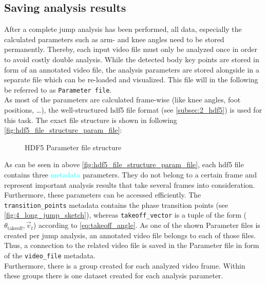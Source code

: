 \subsection{Saving analysis results}\label{subsec:4_param_files}
After a complete jump analysis has been performed, all data, especially
the calculated parameters such as arm- and knee angles need to be stored
permanently.
Thereby, each input video file must only be analyzed once in order to avoid
costly double analysis.
While the detected body key points are stored in form of an annotated video
file, the analysis parameters are stored alongside in a separate file which
can be re-loaded and visualized.
This file will in the following be referred to as \texttt{Parameter file}.\\
As most of the parameters are calculated frame-wise (like knee angles, foot
positions, \dots), the well-structured hdf5 file format (see
\autoref{subsec:2_hdf5}) is used for this task.
The exact file structure is shown in following 
\autoref{fig:hdf5_file_structure_param_file}:
\begin{figure}[h!]
    \centering
    \caption[HDF5 Parameter file structure]{HDF5 Parameter file structure}
    \label{fig:hdf5_file_structure_param_file}
\end{figure}
\FloatBarrier
\noindent As can be seen in above \autoref{fig:hdf5_file_structure_param_file},
each hdf5 file contains three \textcolor{cyan}{metadata} parameters.
They do not belong to a certain frame and represent important analysis results
that take several frames into consideration.
Furthermore, these parameters can be accessed efficiently.
The \texttt{transition\_points} metadata contains the phase transition points
(see \autoref{fig:4_long_jump_sketch}), whereas \texttt{takeoff\_vector} is a
tuple of the form ($\theta_{\text{takeoff}}, \vec{{}v}_t$) according to
\autoref{eq:takeoff_angle}.
As one of the shown Parameter files is created per jump analysis, an annotated
video file belongs to each of those files.
Thus, a connection to the related video file is saved in the
Parameter file in form of the \texttt{video\_file} metadata.\\
Furthermore, there is a group created for each analyzed video frame.
Within these groups there is one dataset created for each analysis parameter.\\

